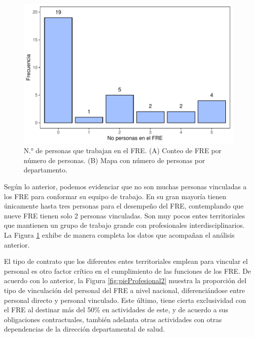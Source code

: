 \documentclass[
]{book}
\begin{document}
\begin{figure}[b!]

{\centering \includegraphics[width=1\linewidth]{InformeFinal_files/figure-latex/perfilProfesional3-1} 

}

\caption{N.° de personas que trabajan en el FRE. (A) Conteo de FRE por número de personas. (B) Mapa con número de personas por departamento.}\label{fig:perfilProfesional3}
\end{figure}

Según lo anterior, podemos evidenciar que no son muchas personas vinculadas a los FRE para conformar su equipo de trabajo. En su gran mayoría tienen únicamente hasta tres personas para el desempeño del FRE, contemplando que nueve FRE tienen solo 2 personas vinculadas. Son muy pocos entes territoriales que mantienen un grupo de trabajo grande con profesionales interdisciplinarios. La Figura \ref{fig:perfilProfesional3} exhibe de manera completa los datos que acompañan el análisis anterior.

El tipo de contrato que los diferentes entes territoriales emplean para vincular el personal es otro factor crítico en el cumplimiento de las funciones de los FRE. De acuerdo con lo anterior, la Figura \ref{fig:pieProfesional2} muestra la proporción del tipo de vinculación del personal del FRE a nivel nacional, diferenciándose entre personal directo y personal vinculado. Este último, tiene cierta exclusividad con el FRE al destinar más del 50\% en actividades de este, y de acuerdo a sus obligaciones contractuales, también adelanta otras actividades con otras dependencias de la dirección departamental de salud.
\end{document}
